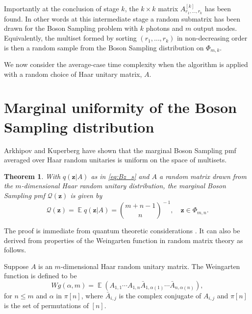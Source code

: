 \documentclass[a4paper,11pt]{article}
\newtheorem{thm}{Theorem}
\newcommand{\EX}{\mathop{{}\mathbb{E}}}
\def\BS/{Boson Sampling}
\begin{document}
Importantly at the conclusion of stage $k$, the $k \times k$ matrix $A_{r_1,\dots, r_k}^{[k]}$ has been found.  In other words at this intermediate stage a random submatrix has been drawn for the \BS/ problem with $k$ photons and $m$ output modes. Equivalently, the multiset formed by sorting $(r_1,\dots, r_k)$ in non-decreasing order is then a random sample from the \BS/ distribution on $\Phi_{m,k}$. 

We now consider the average-case time complexity when the algorithm is applied with a random choice of Haar unitary matrix, $A$.

\section{Marginal uniformity of the \BS/ distribution}
Arkhipov and Kuperberg have shown that the marginal \BS/ pmf averaged over Haar random unitaries is uniform on the space of multisets.     
\vspace{0.5em} 
\begin{thm}\label{thm:AK}
With $q(\mathbf{z}|A)$ as in \eqref{eq:Bz_s} and $A$ a random matrix drawn from the $m$-dimensional Haar random unitary distribution, the marginal \BS/ pmf $\mathcal{Q}(\mathbf{z})$ is given by
\begin{equation}\label{eq:AK}
\mathcal{Q}(\mathbf{z}) = \EX q(\mathbf{z}|A) = \binom{m+n-1}{n}^{\!-1}\!, \quad \mathbf{z} \in \Phi_{m,n}.
\end{equation}
\end{thm}

The proof is immediate from quantum theoretic considerations \citep{AG:2012}.  It can also be derived from properties of the Weingarten function in random matrix theory as follows.

Suppose $A$ is an $m$-dimensional Haar random unitary matrix. The Weingarten function is defined to be
$$ W\!g(\alpha,m) = \EX (A_{1,1}\cdots A_{1,n}\bar{A}_{1,\alpha(1)}\cdots \bar{A}_{n,\alpha(n)}),$$
for $n \leqslant m$ and $\alpha$ in $\pi[n]$, where $\bar{A}_{i,j}$ is the complex conjugate of $A_{i,j}$ and $\pi[n]$ is the set of permutations of $[n]$. 
\end{document}
